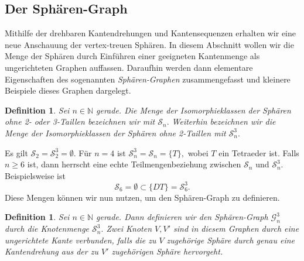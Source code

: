 \documentclass[12pt,titlepage,twoside,cleardoublepage]{article}
\theoremstyle{nummermitklammern}
\newtheorem{definition}[temp]{Definition}
\newtheorem{definition}[zahl]{Definition}
\numberwithin{equation}{section}
\begin{document}
\subsection{Der Sphären-Graph}
Mithilfe der drehbaren Kantendrehungen und Kantensequenzen erhalten wir eine neue Anschauung der vertex-treuen Sphären. In diesem Abschnitt wollen wir die Menge der Sphären durch Einführen einer geeigneten Kantenmenge als ungerichteten Graphen auffassen. Daraufhin werden dann elementare Eigenschaften des sogenannten \emph{Sphären-Graphen} zusammengefasst und kleinere Beispiele dieses Graphen dargelegt. 

\begin{definition}
Sei $n\in \mathbb{N}$ gerade. Die Menge der Isomorphieklassen der Sphären ohne 2- oder 3-Taillen bezeichnen wir mit $\mathcal{S}_n.$ Weiterhin bezeichnen wir die Menge der Isomorphieklassen der Sphären ohne 2-Taillen mit $\mathcal{S}_n^3.$
\end{definition} 
 Es gilt $\mathcal{S}_2=\mathcal{S}_2^3=\emptyset.$ 
 Für $n=4$ ist $\mathcal{S}_n^3=\mathcal{S}_n=\{T\},$ wobei $T$ ein Tetraeder ist.
 Falls $n\geq 6$ ist, dann herrscht eine echte Teilmengenbeziehung zwischen $\mathcal{S}_n$ und $\mathcal{S}_n^3.$ Beispielsweise ist 
 \[
 \mathcal{S}_6=\emptyset \subset \{DT\}=\mathcal{S}_6^3.
 \]
 Diese Mengen können wir nun nutzen, um den Sphären-Graph zu definieren. 
 \begin{definition}
Sei $n\in \mathbb{N}$ gerade. Dann definieren wir den \emph{Sphären-Graph} $\mathcal{G}^3_n$ durch die Knotenmenge $\mathcal{S}^3_n.$ Zwei Knoten $V,V'$ sind in diesem Graphen durch eine ungerichtete Kante verbunden, falls die zu $V$ zugehörige Sphäre durch genau eine Kantendrehung aus der zu $V'$ zugehörigen Sphäre hervorgeht. 
 \end{definition}
\end{document}
